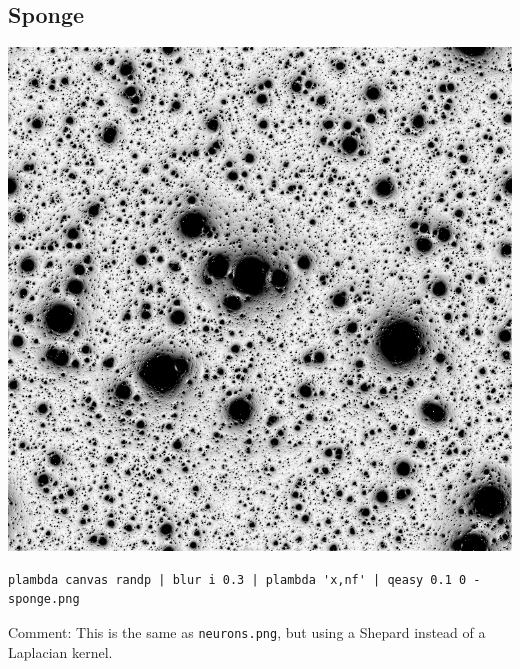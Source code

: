 \subsection{Sponge}
\includegraphics{sponge.png}
\begin{verbatim}
plambda canvas randp | blur i 0.3 | plambda 'x,nf' | qeasy 0.1 0 - sponge.png
\end{verbatim}
Comment: This is the same as \verb+neurons.png+, but using a Shepard instead
of a Laplacian kernel.

